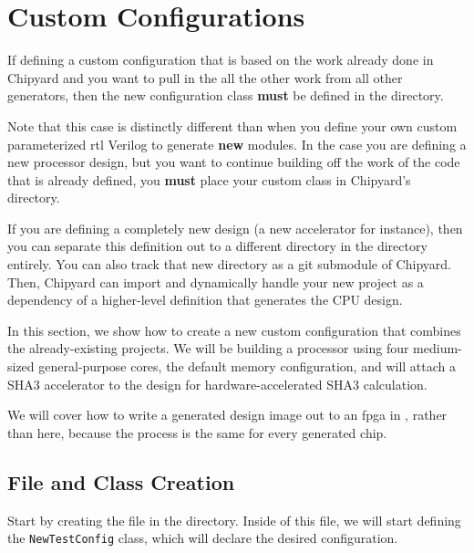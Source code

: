 \section{Custom Configurations}\label{sec:Custom_Configurations}
If defining a custom configuration that is based on the work already done in Chipyard and you want to pull in the all the other work from all other generators, then the new configuration class \textbf{must} be defined in the  directory.

\begin{blackbox}
  Note that this case is distinctly different than when you define your own custom parameterized \gls{rtl} Verilog to generate \textbf{new} modules.
  In the case you are defining a new processor design, but you want to continue building off the work of the code that is already defined, you \textbf{must} place your custom class in Chipyard's  directory.

  If you are defining a completely new design (a new \gls{accelerator} for instance), then you can separate this definition out to a different directory in the  directory entirely.
  You can also track that new directory as a git submodule of Chipyard.
  Then, Chipyard can import and dynamically handle your new project as a dependency of a higher-level definition that generates the CPU design.
\end{blackbox}

In this section, we show how to create a new custom configuration that combines the already-existing projects.
We will be building a processor using four medium-sized  general-purpose cores, the default memory configuration, and will attach a SHA3 accelerator to the design for hardware-accelerated SHA3 calculation.

We will cover how to write a generated design image out to an \gls{fpga} in , rather than here, because the process is the same for every generated chip.

\subsection{File and Class Creation}\label{sec:Custom_Config-File_Class}
Start by creating the  file in the  directory.
Inside of this file, we will start defining the \texttt{NewTestConfig} class, which will declare the desired configuration.

